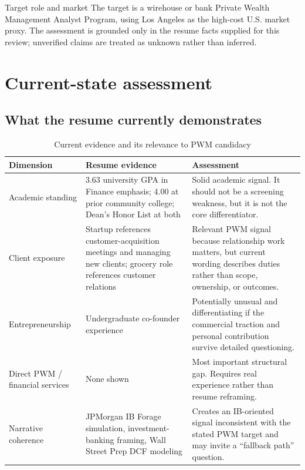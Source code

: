 \documentclass{reportkit}
\begin{document}
\begin{assumption}{Target role and market}
The target is a wirehouse or bank Private Wealth Management Analyst Program, using Los Angeles as the high-cost U.S. market proxy. The assessment is grounded only in the resume facts supplied for this review; unverified claims are treated as unknown rather than inferred.
\end{assumption}

\section{Current-state assessment}

\subsection{What the resume currently demonstrates}

\begin{table}[htbp]
\centering
\caption{Current evidence and its relevance to PWM candidacy}
\begin{tabular}{p{} p{} p{}}
\toprule
\textbf{Dimension} & \textbf{Resume evidence} & \textbf{Assessment} \\
\midrule
Academic standing & 3.63 university GPA in Finance emphasis; 4.00 at prior community college; Dean's Honor List at both & Solid academic signal. It should not be a screening weakness, but it is not the core differentiator. \\
Client exposure & Startup references customer-acquisition meetings and managing new clients; grocery role references customer relations & Relevant PWM signal because relationship work matters, but current wording describes duties rather than scope, ownership, or outcomes. \\
Entrepreneurship & Undergraduate co-founder experience & Potentially unusual and differentiating if the commercial traction and personal contribution survive detailed questioning. \\
Direct PWM / financial services & None shown & Most important structural gap. Requires real experience rather than resume reframing. \\
Narrative coherence & JPMorgan IB Forage simulation, investment-banking framing, Wall Street Prep DCF modeling & Creates an IB-oriented signal inconsistent with the stated PWM target and may invite a ``fallback path'' question. \\
\bottomrule
\end{tabular}
\end{table}
\end{document}
